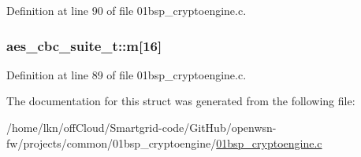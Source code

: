 Definition at line 90 of file 01bsp\+\_\+cryptoengine.\+c.

\subsubsection[{\texorpdfstring{m}{m}}]{ aes\+\_\+cbc\+\_\+suite\+\_\+t\+::m\mbox{[}16\mbox{]}}\hypertarget{structaes__cbc__suite__t_aec468586dc8ee15780ba1397067c2026}{}\label{structaes__cbc__suite__t_aec468586dc8ee15780ba1397067c2026}


Definition at line 89 of file 01bsp\+\_\+cryptoengine.\+c.



The documentation for this struct was generated from the following file\+:\begin{DoxyCompactItemize}
\item 
/home/lkn/off\+Cloud/\+Smartgrid-\/code/\+Git\+Hub/openwsn-\/fw/projects/common/01bsp\+\_\+cryptoengine/\hyperlink{01bsp__cryptoengine_8c}{01bsp\+\_\+cryptoengine.\+c}\end{DoxyCompactItemize}
